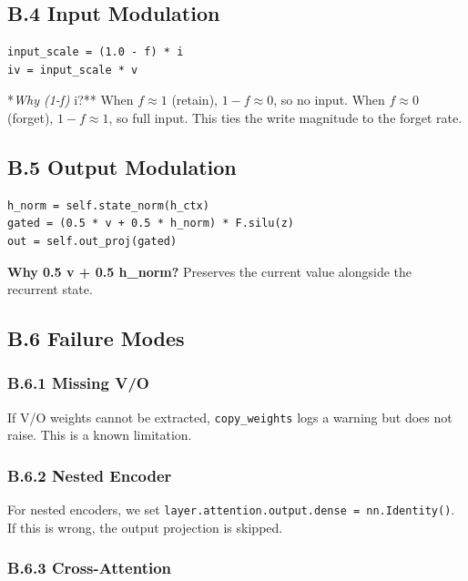 \subsection{B.4 Input Modulation}

\begin{lstlisting}
input_scale = (1.0 - f) * i
iv = input_scale * v
\end{lstlisting}

*\textit{Why (1-f) } i?** When $f \approx 1$ (retain), $1 - f \approx 0$, so no 
input. When $f \approx 0$ (forget), $1 - f \approx 1$, so full input. This 
ties the write magnitude to the forget rate.

\subsection{B.5 Output Modulation}

\begin{lstlisting}
h_norm = self.state_norm(h_ctx)
gated = (0.5 * v + 0.5 * h_norm) * F.silu(z)
out = self.out_proj(gated)
\end{lstlisting}

\textbf{Why 0.5 v + 0.5 h\_norm?} Preserves the current value alongside the 
recurrent state.

\subsection{B.6 Failure Modes}

\subsubsection{B.6.1 Missing V/O}

If V/O weights cannot be extracted, \texttt{copy\_weights} logs a warning but does 
not raise. This is a known limitation.

\subsubsection{B.6.2 Nested Encoder}

For nested encoders, we set \texttt{layer.attention.output.dense = nn.Identity()}. 
If this is wrong, the output projection is skipped.

\subsubsection{B.6.3 Cross-Attention}

